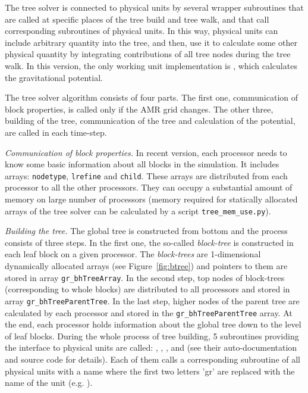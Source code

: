 The tree solver is connected to physical units by several wrapper subroutines
that are called at specific places of the tree build and tree walk, and that
call corresponding subroutines of physical units. In this way, physical
units can include arbitrary quantity into the tree, and then, use it to
calculate some other physical quantity by integrating contributions of all tree
nodes during the tree walk. In this version, the only working unit implementation is
, which calculates the gravitational
potential.

The tree solver algorithm consists of four parts. The first one, communication of block
properties, is called only if the AMR grid changes. The other three, building of
the tree, communication of the tree and calculation of the potential, are called
in each time-step.

\textit{Communication of block properties.} In recent version, each processor
needs to know some basic information about all blocks in the simulation. It
includes arrays: \texttt{nodetype}, \texttt{lrefine} and \texttt{child}. These
arrays are distributed from each processor to all the other processors. They can
occupy a substantial amount of memory on large number of processors (memory
required for statically allocated arrays of the tree solver can be calculated by
a script \texttt{tree\_mem\_use.py}). 

\textit{Building the tree.} The global tree is constructed from bottom and the
process consists of three steps. In the first one, the so-called {\em
block-tree} is constructed in each leaf block on a given processor. The {\em
block-trees} are 1-dimensional dynamically allocated arrays (see
Figure~\ref{fig:btree}) and pointers to them are stored in array
\texttt{gr\_bhTreeArray}. In the second step, top nodes of block-trees
(corresponding to whole blocks) are distributed to all processors and stored in
array \texttt{gr\_bhTreeParentTree}. In the last step, higher nodes of the
parent tree are calculated by each processor and stored in the
\texttt{gr\_bhTreeParentTree} array. At the end, each processor holds
information about the global tree down to the level of leaf blocks. During the
whole process of tree building, 5 subroutines providing the interface to
physical units are called: ,
, , 
and  (see their auto-documentation and source code
for details). Each of them calls a corresponding subroutine of all physical
units with a name where the first two letters 'gr' are replaced with the name
of the unit (e.g. ).

